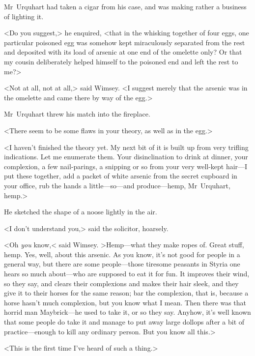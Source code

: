 Mr~Urquhart had taken a cigar from his case, and was making rather a business of lighting it.

<Do you suggest,> he enquired, <that in the whisking together of four eggs, one particular poisoned egg was somehow kept miraculously separated from the rest and deposited with its load of arsenic at one end of the omelette only? Or that my cousin deliberately helped himself to the poisoned end and left the rest to me?>

<Not at all, not at all,> said Wimsey. <I suggest merely that the arsenic was in the omelette and came there by way of the egg.>

Mr~Urquhart threw his match into the fireplace.

<There seem to be some flaws in your theory, as well as in the egg.>

<I haven't finished the theory yet. My next bit of it is built up from very trifling indications. Let me enumerate them. Your disinclination to drink at dinner, your complexion, a few nail-parings, a snipping or so from your very well-kept hair—I put these together, add a packet of white arsenic from the secret cupboard in your office, rub the hands a little—so—and produce—hemp, Mr~Urquhart, hemp.>

He sketched the shape of a noose lightly in the air.

<I don't understand you,> said the solicitor, hoarsely.

<Oh \emph{you} know,< said Wimsey. >Hemp—what they make ropes of. Great stuff, hemp. Yes, well, about this arsenic. As you know, it's not good for people in a general way, but there are some people—those tiresome peasants in Styria one hears so much about—who are supposed to eat it for fun. It improves their wind, so they say, and clears their complexions and makes their hair sleek, and they give it to their horses for the same reason; bar the complexion, that is, because a horse hasn't much complexion, but you know what I mean. Then there was that horrid man Maybrick—he used to take it, or so they say. Anyhow, it's well known that some people do take it and manage to put away large dollops after a bit of practice—enough to kill any ordinary person. But you know all this.>

<This is the first time I've heard of such a thing.>

